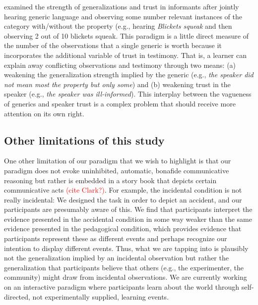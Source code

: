 \documentclass[10pt,letterpaper]{article}
\newcommand{\red}[1]{\textcolor{Red}{#1}}
\begin{document}
 examined the strength of generalizations and trust in informants after jointly hearing generic language and observing some number relevant instances of the category with/without the property (e.g., hearing \emph{Blickets squeak} and then observing 2 out of 10 blickets squeak.
This paradigm is a little direct measure of the number of the observations that a single generic is worth because it incorporates the additional variable of trust in testimony.
That is, a learner can explain away conflicting observations and testimony through two means: (a) weakening the generalization strength implied by the generic (e.g., \emph{the speaker did not mean most the property but only some}) and (b) weakening trust in the speaker (e.g., \emph{the speaker was ill-informed}). 
This interplay between the vagueness of generics and speaker trust is a complex problem that should receive more attention on its own right. 

\subsection{Other limitations of this study}

One other limitation of our paradigm that we wish to highlight is that our paradigm does not evoke uninhibited, automatic, bonafide communicative reasoning but rather is embedded in a story book that depicts certain communicative acts \red{(cite Clark?)}. 
For example, the incidental condition is not really incidental: We designed the task in order to depict an accident, and our participants are presumably aware of this. 
We find that participants interpret the evidence presented in the accidental condition in some way weaker than the same evidence presented in the pedagogical condition, which provides evidence that participants represent these as different events and perhaps recognize our intention to display different events. Thus, what we are tapping into is plausibly not the generalization implied by an incidental observation but rather the generalization that participants believe that others (e.g., the experimenter, the community) might draw from incidental observations. 
We are currently working on an interactive paradigm where participants learn about the world through self-directed, not experimentally supplied, learning events. 






\setlength{\bibleftmargin}{.125in}
\setlength{\bibindent}{-\bibleftmargin}


\end{document}

